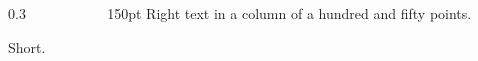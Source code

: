 \documentclass[t]{beamer}
\begin{document}
\begin{frame}
\begin{columns}[onlytextwidth]
\begin{column}{0.3\linewidth}
\begin{theorem}
Short.
\end{theorem}
\end{column}
\begin{column}{150pt}
Right text in a column of a hundred and fifty points.
\end{column}
\end{columns}
\end{frame}
\end{document}
